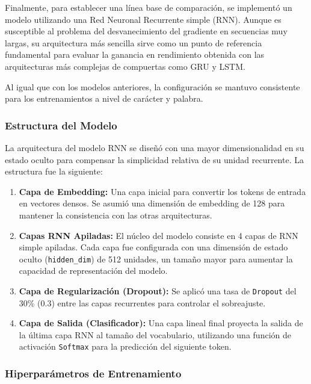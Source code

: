 Finalmente, para establecer una línea base de comparación, se implementó un modelo utilizando una Red Neuronal Recurrente simple (RNN). Aunque es susceptible al problema del desvanecimiento del gradiente en secuencias muy largas, su arquitectura más sencilla sirve como un punto de referencia fundamental para evaluar la ganancia en rendimiento obtenida con las arquitecturas más complejas de compuertas como GRU y LSTM.

Al igual que con los modelos anteriores, la configuración se mantuvo consistente para los entrenamientos a nivel de carácter y palabra.

\subsubsection{Estructura del Modelo}

La arquitectura del modelo RNN se diseñó con una mayor dimensionalidad en su estado oculto para compensar la simplicidad relativa de su unidad recurrente. La estructura fue la siguiente:

\begin{enumerate}
    \item \textbf{Capa de Embedding:} Una capa inicial para convertir los tokens de entrada en vectores densos. Se asumió una dimensión de embedding de 128 para mantener la consistencia con las otras arquitecturas.

    \item \textbf{Capas RNN Apiladas:} El núcleo del modelo consiste en 4 capas de RNN simple apiladas. Cada capa fue configurada con una dimensión de estado oculto (\texttt{hidden\_dim}) de 512 unidades, un tamaño mayor para aumentar la capacidad de representación del modelo.

    \item \textbf{Capa de Regularización (Dropout):} Se aplicó una tasa de \texttt{Dropout} del 30\% (0.3) entre las capas recurrentes para controlar el sobreajuste.

    \item \textbf{Capa de Salida (Clasificador):} Una capa lineal final proyecta la salida de la última capa RNN al tamaño del vocabulario, utilizando una función de activación \texttt{Softmax} para la predicción del siguiente token.
\end{enumerate}

\subsubsection{Hiperparámetros de Entrenamiento}

